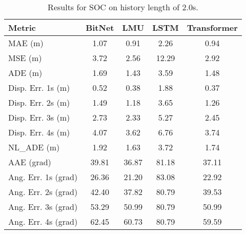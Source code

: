 \begin{table}[H]
\centering
\caption{Results for SOC on history length of 2.0s.}
\label{hist:SOC_2.0s}
\begin{tabular}{l||c|c|c|c}
Metric & BitNet & LMU & LSTM & Transformer \\
\hline \hline
MAE (m) & 1.07 & 0.91 & 2.26 & 0.94 \\
MSE (m) & 3.72 & 2.56 & 12.29 & 2.92 \\
ADE (m) & 1.69 & 1.43 & 3.59 & 1.48 \\
Disp. Err. 1s (m) & 0.52 & 0.38 & 1.88 & 0.37 \\
Disp. Err. 2s (m) & 1.49 & 1.18 & 3.65 & 1.26 \\
Disp. Err. 3s (m) & 2.73 & 2.33 & 5.27 & 2.45 \\
Disp. Err. 4s (m) & 4.07 & 3.62 & 6.76 & 3.74 \\
NL\_ADE (m) & 1.92 & 1.63 & 3.72 & 1.74 \\
AAE (grad) & 39.81 & 36.87 & 81.18 & 37.11 \\
Ang. Err. 1s (grad) & 26.36 & 21.20 & 83.08 & 22.92 \\
Ang. Err. 2s (grad) & 42.40 & 37.82 & 80.79 & 39.53 \\
Ang. Err. 3s (grad) & 53.29 & 50.99 & 80.79 & 50.99 \\
Ang. Err. 4s (grad) & 62.45 & 60.73 & 80.79 & 59.59 \\
\end{tabular}
\end{table}
